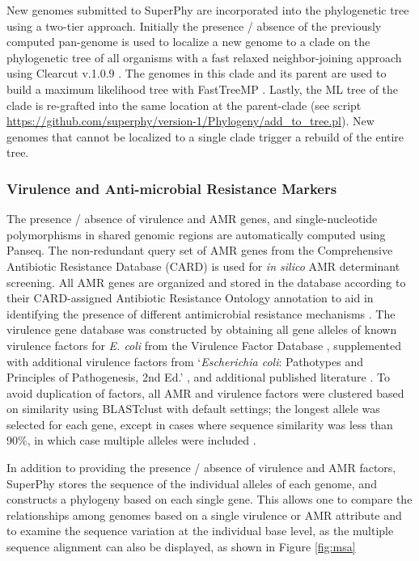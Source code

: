 \documentclass[doublespacing, linenumbers]{bmcart}
\begin{document}
New genomes submitted to SuperPhy are incorporated into the phylogenetic tree using a two-tier approach. Initially the presence / absence of the previously computed pan-genome is used to localize a new genome to a clade on the phylogenetic tree of all organisms with a fast relaxed neighbor-joining approach using Clearcut v.1.0.9 \cite{sheneman_clearcut:_2006}. The genomes in this clade and its parent are used to build a maximum likelihood tree with FastTreeMP \cite{price_fasttree_2010}. Lastly, the ML tree of the clade is re-grafted into the same location at the parent-clade (see script \url{https://github.com/superphy/version-1/Phylogeny/add_to_tree.pl}). New genomes that cannot be localized to a single clade trigger a rebuild of the entire tree.

\subsubsection{Virulence and Anti-microbial Resistance Markers}
The presence / absence of virulence and AMR genes, and single-nucleotide polymorphisms in shared genomic regions are automatically computed using Panseq. The non-redundant query set of AMR genes from the Comprehensive Antibiotic Resistance Database (CARD) \cite{mcarthur_comprehensive_2013} is used for \textit{in silico} AMR determinant screening. All AMR genes are organized and stored in the database according to their CARD-assigned Antibiotic Resistance Ontology annotation to aid in identifying the presence of different antimicrobial resistance mechanisms . The virulence gene database was constructed by obtaining all gene alleles of known virulence factors for \textit{E. coli} from the Virulence Factor Database \cite{chen_vfdb_2011}, supplemented with additional virulence factors from `\textit{Escherichia coli}: Pathotypes and Principles of Pathogenesis, 2nd Ed.' , and additional published literature \cite{donnenberg_escherichia_2013}. To avoid duplication of factors, all AMR and virulence factors were clustered based on similarity using BLASTclust with default settings; the longest allele was selected for each gene, except in cases where sequence similarity was less than 90\%, in which case multiple alleles were included \cite{altschul_gapped_1997}.

In addition to providing the presence / absence of virulence and AMR factors, SuperPhy stores the sequence of the individual alleles of each genome, and constructs a phylogeny based on each single gene. This allows one to compare the relationships among genomes based on a single virulence or AMR attribute and to examine the sequence variation at the individual base level, as the multiple sequence alignment can also be displayed, as shown in Figure \ref{fig:msa}
\end{document}
